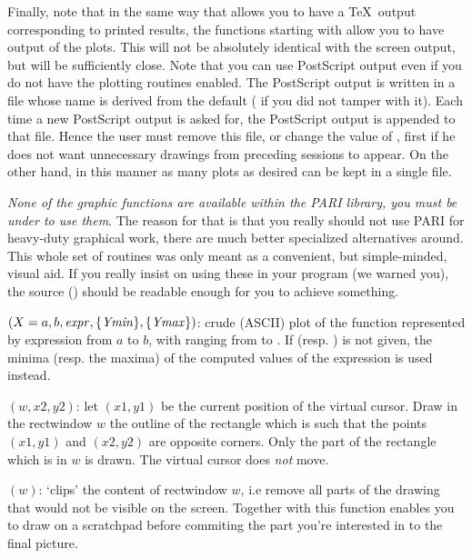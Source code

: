 \item Finally, note that in the same way that  allows you
to have a \TeX\ output corresponding to printed results, the functions
starting with  allow you to have  output of the
plots. This will not be absolutely identical with the screen output, but will
be sufficiently close. Note that you can use PostScript output even if you do
not have the plotting routines enabled. The PostScript output is written in a
file whose name is derived from the  default ( if
you did not tamper with it). Each time a new PostScript output is asked for,
the PostScript output is appended to that file. Hence the user must remove
this file, or change the value of , first if he does not want
unnecessary drawings from preceding sessions to appear. On the other hand, in
this manner as many plots as desired can be kept in a single file. \smallskip

\emph{None of the graphic functions are available within the PARI library, you
must be under  to use them}. The reason for that is that you really should
not use PARI for heavy-duty graphical work, there are much better specialized
alternatives around. This whole set of routines was only meant as a
convenient, but simple-minded, visual aid. If you really insist on using
these in your program (we warned you), the source () should be
readable enough for you to achieve something.

$(X=a,b,\hbox{\it expr\/},\{\hbox{\it Ymin\/}\},\{\hbox{\it Ymax\/}\})$: crude
(ASCII) plot of the function represented by expression  from
$a$ to $b$, with  ranging from  to . If
 (resp. ) is not given, the minima (resp. the
maxima) of the computed values of the expression is used instead.

$(w,x2,y2)$: let $(x1,y1)$ be the current position of the
virtual cursor. Draw in the rectwindow $w$ the outline of the rectangle which
is such that the points $(x1,y1)$ and $(x2,y2)$ are opposite corners. Only
the part of the rectangle which is in $w$ is drawn. The virtual cursor does
\emph{not} move.

$(w)$: `clips' the content of rectwindow $w$, i.e
remove all parts of the drawing that would not be visible on the screen.
Together with  this function enables you to draw on a
scratchpad before commiting the part you're interested in to the final
picture.

